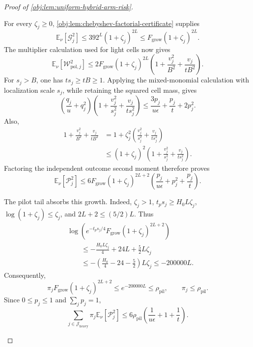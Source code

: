 \begin{proof}[Proof of \cref{obj:lem:uniform-hybrid-arm-risk}]
\begin{enumerate}
For every \(\zeta_j\ge0\),
\cref{obj:lem:chebyshev-factorial-certificate} supplies
\[
\mathbb E_\nu[\mathcal G_j^2]
\le392^L(1+\zeta_j)^{2L}
\le F_{\mathrm{grow}}(1+\zeta_j)^{2L}.
\]
The multiplier calculation used for light cells now gives
\[
\mathbb E_\nu[\mathcal W_{\mathrm{pol},j}^2]
\le
2F_{\mathrm{grow}}(1+\zeta_j)^{2L}
\left(1+\frac{v_j^2}{B^2}+\frac{v_j}{tB^2}\right).
\]
For \(s_j>B\), one has \(ts_j\ge tB\ge1\). Applying the mixed-monomial calculation with localization scale \(s_j\), while retaining the squared cell mass, gives
\[
\left(\frac{q_j}{u}+q_j^2\right)
\left(1+\frac{v_j^2}{s_j^2}+\frac{v_j}{ts_j^2}\right)
\le
\frac{3p_j}{u\epsilon}+\frac{p_j}{t}+2p_j^2.
\]
Also,
\[
\begin{aligned}
1+\frac{v_j^2}{B^2}+\frac{v_j}{tB^2}
&=
1+\zeta_j^2
\left(\frac{v_j^2}{s_j^2}+\frac{v_j}{ts_j^2}\right)\\
&\le
(1+\zeta_j)^2
\left(1+\frac{v_j^2}{s_j^2}+\frac{v_j}{ts_j^2}\right).
\end{aligned}
\]
Factoring the independent outcome second moment therefore proves
\[
\mathbb E_\nu[\mathcal P_j^2]
\le
6F_{\mathrm{grow}}(1+\zeta_j)^{2L+2}
\left(\frac{p_j}{u\epsilon}+p_j^2+\frac{p_j}{t}\right).
\]

The pilot tail absorbs this growth. Indeed, \(\zeta_j>1\),
\(t_ps_j\ge H_0L\zeta_j\), \(\log(1+\zeta_j)\le\zeta_j\), and
\(2L+2\le(5/2)L\). Thus
\[
\begin{aligned}
&\log\left(
e^{-t_ps_j/4}F_{\mathrm{grow}}(1+\zeta_j)^{2L+2}
\right)\\
&\qquad\le
-\frac{H_0L\zeta_j}{4}
+24L+\frac52L\zeta_j\\
&\qquad\le
-\left(\frac{H_0}{4}-24-\frac52\right)L\zeta_j
\le-200000L.
\end{aligned}
\]
Consequently,
\[
\pi_jF_{\mathrm{grow}}(1+\zeta_j)^{2L+2}
\le e^{-200000L}\le\rho_{\mathrm{pil}},
\qquad
\pi_j\le\rho_{\mathrm{pil}}.
\]
Since \(0\le p_j\le1\) and \(\sum_jp_j=1\),
\[
\sum_{j\in\mathcal J_{\mathrm{heavy}}}
\pi_j\mathbb E_\nu[\mathcal P_j^2]
\le
6\rho_{\mathrm{pil}}
\left(\frac1{u\epsilon}+1+\frac1t\right).
\]


\end{enumerate}
\end{proof}
